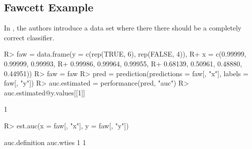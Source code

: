 \documentclass[article]{jss}
\begin{document}
\hypertarget{fawcett-example}{%
\subsection{Fawcett Example}\label{fawcett-example}}

In \citet{fawcett2006introduction}, the authors introduce a data set
where there there should be a completely correct classifier.

\begin{CodeChunk}

\begin{CodeInput}
R> faw = data.frame(y = c(rep(TRUE, 6), rep(FALSE, 4)),
R+                  x = c(0.99999, 0.99999, 0.99993, 
R+                        0.99986, 0.99964, 0.99955, 
R+                        0.68139, 0.50961, 0.48880, 0.44951))
R> faw = faw %
R> pred = prediction(predictions = faw[, "x"], labels = faw[, "y"])
R> auc.estimated = performance(pred, "auc")
R> auc.estimated@y.values[[1]]
\end{CodeInput}

\begin{CodeOutput}
[1] 1
\end{CodeOutput}

\begin{CodeInput}
R> est.auc(x = faw[, "x"], y = faw[, "y"])
\end{CodeInput}

\begin{CodeOutput}
auc.definition      auc.wties 
             1              1 
\end{CodeOutput}
\end{CodeChunk}


\end{document}
